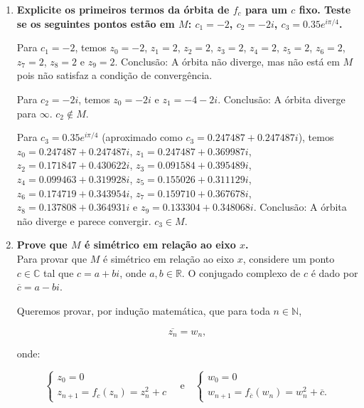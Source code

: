 \begin{enumerate}[label=(\alph*)]
    \item \textbf{Explicite os primeiros termos da órbita de \( f_c \) para um \( c \) fixo. Teste se os seguintes pontos estão em \( M \): \( c_1 = -2 \), \( c_2 = -2i \), \( c_3 = 0.35 e^{i\pi/4} \).}
    
        Para \( c_1 = -2 \), temos \( z_0 = -2 \), \( z_1 = 2 \), \( z_2 = 2 \), \( z_3 = 2 \), \( z_4 = 2 \), \( z_5 = 2 \), \( z_6 = 2 \), \( z_7 = 2 \), \( z_8 = 2 \) e \( z_9 = 2 \). Conclusão: A órbita não diverge, mas não está em \( M \) pois não satisfaz a condição de convergência.

        Para \( c_2 = -2i \), temos \( z_0 = -2i \) e \( z_1 = -4 - 2i \). Conclusão: A órbita diverge para \( \infty \). \( c_2 \notin M \).

        Para \( c_3 = 0.35 e^{i\pi/4} \) (aproximado como \( c_3 = 0.247487 + 0.247487i \)), temos \( z_0 = 0.247487 + 0.247487i \), \( z_1 = 0.247487 + 0.369987i \), \( z_2 = 0.171847 + 0.430622i \), \( z_3 = 0.091584 + 0.395489i \), \( z_4 = 0.099463 + 0.319928i \), \( z_5 = 0.155026 + 0.311129i \), \( z_6 = 0.174719 + 0.343954i \), \( z_7 = 0.159710 + 0.367678i \), \( z_8 = 0.137808 + 0.364931i \) e \( z_9 = 0.133304 + 0.348068i \). Conclusão: A órbita não diverge e parece convergir. \( c_3 \in M \).

    

    \item \textbf{Prove que \( M \) é simétrico em relação ao eixo \( x \).} \\

        Para provar que \( M \) é simétrico em relação ao eixo \( x \), considere um ponto \( c \in \mathbb{C} \) tal que \( c = a + bi \), onde \( a, b \in \mathbb{R} \). O conjugado complexo de \( c \) é dado por \( \overline{c} = a - bi \).

        Queremos provar, por indução matemática, que para toda \( n \in \mathbb{N} \),

        \[
        \overline{z_n} = w_n,
        \]

        onde:

        \[
        \begin{cases}
        z_0 = 0 \\
        z_{n+1} = f_c(z_n) = z_n^2 + c
        \end{cases}
        \quad \text{e} \quad
        \begin{cases}
        w_0 = 0 \\
        w_{n+1} = f_{\overline{c}}(w_n) = w_n^2 + \overline{c}.
        \end{cases}
        \]


\end{enumerate}
